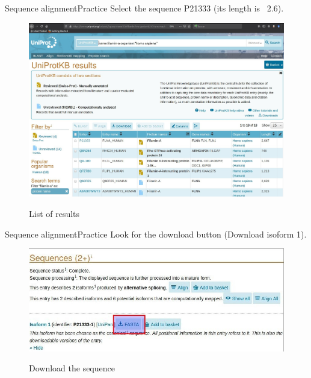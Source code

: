 \documentclass[10pt]{beamer}
\begin{document}
{%
\begin{frame}{Sequence alignment}{Practice}
Select the sequence P21333 (its length is \string ~2.6). 
\begin{figure}[]
 \centering
    \includegraphics[width=\textwidth,height=0.6\textheight,keepaspectratio]{img/alignment/uniprot3.jpg}
    \label{img:uniprot2}
    \caption{List of results}
\end{figure}
\end{frame}

\begin{frame}{Sequence alignment}{Practice}
Look for the download button (Download isoform 1).
\begin{figure}[]
 \centering
    \includegraphics[width=\textwidth,height=0.6\textheight,keepaspectratio]{img/alignment/uniprot4.jpg}
    \label{img:uniprot2}
    \caption{Download the sequence}
\end{figure}
\end{frame}

}
\end{document}
